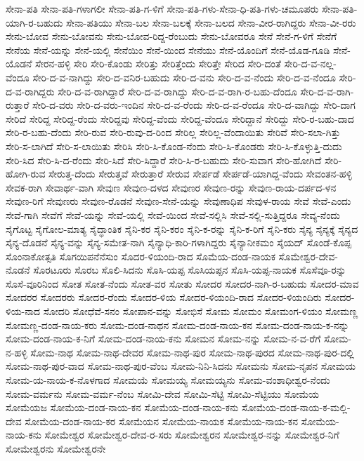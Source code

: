 {ಸೇನಾ-ಪತಿ
ಸೇನಾ-ಪತಿ-ಗಳಾಗಲೀ
ಸೇನಾ-ಪತಿ-ಗ-ಳಿಗೆ
ಸೇನಾ-ಪತಿ-ಗಳು-ಸೇನಾ-ಧಿ-ಪತಿ-ಗಳು-ಚಮೂಪರು
ಸೇನಾ-ಪತಿ-ಯಾಗಿ-ರ-ಬಹುದು
ಸೇನಾ-ಪತಿಯು
ಸೇನಾ-ಬಲ
ಸೇನಾ-ಬಲಕ್ಕೆ
ಸೇನಾ-ಬಲದ
ಸೇನಾ-ವೀರ-ರಾಗಿದ್ದರು
ಸೇನಾ-ವೀ-ರರು
ಸೇನು-ಬೋವ
ಸೇನು-ಬೋವನು
ಸೇನು-ಬೋವ-ರಿದ್ದ-ರೆಂಬುದು
ಸೇನು-ಬೋವರೂ
ಸೇನೆ
ಸೇನೆ-ಗ-ಳಿಗೆ
ಸೇನೆಗೆ
ಸೇನೆಯ
ಸೇನೆ-ಯನ್ನು
ಸೇನೆ-ಯಲ್ಲಿ
ಸೇನೆಯಿಂ
ಸೇನೆ-ಯಿಂದ
ಸೇನೆಯು
ಸೇನೆ-ಯೊಂದಿಗೆ
ಸೇನೆ-ಯೊಡ-ಗೂಡಿ
ಸೇನೆ-ಯೊಡನೆ
ಸೇರನ-ಹಳ್ಳಿ
ಸೇರಿ
ಸೇರಿ-ಕೊಂಡು
ಸೇರಿತ್ತು
ಸೇರಿತ್ತೆಂದು
ಸೇರಿತ್ತೇ
ಸೇರಿದ
ಸೇರಿ-ದಂತೆ
ಸೇರಿ-ದ-ವ-ನಲ್ಲ-ವೆಂದೂ
ಸೇರಿ-ದ-ವ-ನಾಗಿದ್ದು
ಸೇರಿ-ದ-ವನಿರ-ಬಹುದು
ಸೇರಿ-ದ-ವನು
ಸೇರಿ-ದ-ವ-ನೆಂದು
ಸೇರಿ-ದ-ವ-ನೆಂದೂ
ಸೇರಿ-ದ-ವ-ರಾಗಿದ್ದರು
ಸೇರಿ-ದ-ವ-ರಾಗಿದ್ದಾರೆ
ಸೇರಿ-ದ-ವ-ರಾಗಿದ್ದು
ಸೇರಿ-ದ-ವ-ರಾಗಿ-ರ-ಬಹು-ದೆಂದೂ
ಸೇರಿ-ದ-ವ-ರಾಗಿ-ರುತ್ತಾರೆ
ಸೇರಿ-ದ-ವರು
ಸೇರಿ-ದ-ವರು-ಇಂದಿನ
ಸೇರಿ-ದ-ವ-ರೆಂದು
ಸೇರಿ-ದ-ವ-ರೆಂದೂ
ಸೇರಿ-ದ-ವಾಗಿದ್ದು
ಸೇರಿ-ದಾಗ
ಸೇರಿದೆ
ಸೇರಿದ್ದ
ಸೇರಿದ್ದ-ರೆಂದು
ಸೇರಿದ್ದವು
ಸೇರಿದ್ದ-ವೆಂದು
ಸೇರಿದ್ದ-ವೆಂದೂ
ಸೇರಿದ್ದಾನೆ
ಸೇರಿದ್ದು
ಸೇರಿ-ರ-ಬಹು-ದಾದ
ಸೇರಿ-ರ-ಬಹು-ದೆಂದು
ಸೇರಿ-ರುವ
ಸೇರಿ-ರುವು-ದ-ರಿಂದ
ಸೇರಿಲ್ಲ
ಸೇರಿಲ್ಲ-ವೆಂದಾಯಿತು
ಸೇರಿವೆ
ಸೇರಿ-ಸಲಾ-ಗಿತ್ತು
ಸೇರಿ-ಸ-ಲಾಗಿದೆ
ಸೇರಿ-ಸ-ಲಾಯಿತು
ಸೇರಿಸಿ
ಸೇರಿ-ಸಿ-ಕೊಂಡ-ನೆಂದು
ಸೇರಿ-ಸಿ-ಕೊಂಡರು
ಸೇರಿ-ಸಿ-ಕೊಳ್ಳುತ್ತಿ-ದುದು
ಸೇರಿ-ಸಿದ
ಸೇರಿ-ಸಿ-ದ-ರೆಂದು
ಸೇರಿ-ಸಿದೆ
ಸೇರಿ-ಸಿದ್ದಾರೆ
ಸೇರಿ-ಸಿ-ರ-ಬಹುದು
ಸೇರಿ-ಸುವಾಗ
ಸೇರಿ-ಹೋಗಿದೆ
ಸೇರಿ-ಹೋಗಿ-ರುವ
ಸೇರುತ್ತ-ದೆಂದು
ಸೇರುತ್ತವೆ
ಸೇರುತ್ತಾರೆ
ಸೇರುವ
ಸೇರ್ಪಡೆ
ಸೇರ್ಪಡೆ-ಯಾಗಿದ್ದ-ವೆಂದು
ಸೇವಂತನ-ಹಳ್ಳಿ
ಸೇವಕ-ರಾಗಿ
ಸೇವಾರ್ಥ-ವಾಗಿ
ಸೇವುಣ
ಸೇವುಣ-ದಳದ
ಸೇವುಣರ
ಸೇವುಣ-ರನ್ನು
ಸೇವುಣ-ರಾಯ-ದರ್ಪದ-ಳನ
ಸೇವುಣ-ರಿಗೆ
ಸೇವುಣರು
ಸೇವುಣ-ರೊಡನೆ
ಸೇವುಣ-ಸೇನೆ-ಯನ್ನು
ಸೇವುಣಾಧಿಪ
ಸೇವುಳ-ರಾಯ
ಸೇವೆ
ಸೇವೆ-ಎಂದು
ಸೇವೆ-ಗಾಗಿ
ಸೇವೆಗೆ
ಸೇವೆ-ಯನ್ನು
ಸೇವೆ-ಯಲ್ಲಿ
ಸೇವೆ-ಯಿಂದ
ಸೇವೆ-ಸಲ್ಲಿಸಿ
ಸೇವೆ-ಸಲ್ಲಿ-ಸುತ್ತಿದ್ದರೂ
ಸೇವ್ಯ-ನೆಂದು
ಸೈಗೊಟ್ಟ
ಸೈಗೋಲ-ಮಾತ್ಯ
ಸೈದ್ಧಾಂತಿಕ
ಸೈನಿ-ಕರ
ಸೈನಿ-ಕರಂ
ಸೈನಿ-ಕ-ರನ್ನು
ಸೈನಿ-ಕ-ರಿಗೆ
ಸೈನಿ-ಕರು
ಸೈನ್ಯ
ಸೈನ್ಯಕ್ಕೆ
ಸೈನ್ಯದ
ಸೈನ್ಯ-ದೊಡನೆ
ಸೈನ್ಯ-ವನ್ನು
ಸೈನ್ಯ-ಸಮೇತ-ನಾಗಿ
ಸೈನ್ಯಾಧಿ-ಕಾರಿ-ಗಳಾಗಿದ್ದರು
ಸೈನ್ಯಾನೀಕಮಂ
ಸೈಯದ್
ಸೊಂಡೆ-ಕೊಪ್ಪ
ಸೊಂನಾಕೋತ್ಸತಿ
ಸೊಗಯಿಪನೆನೆಸುಂ
ಸೊದರ-ಳಿಯಂದಿ-ರಾದ
ಸೊಮೆಯ-ದಂಡ-ನಾಯಕ
ಸೊಮೇಶ್ವರ-ದೇವ-ನೊಡನೆ
ಸೊರಟೂರು
ಸೊರಬ
ಸೊಲಿ-ಸಿದನು
ಸೊಸಿ-ಯಪ್ಪ
ಸೊಸಿಯಪ್ಪನ
ಸೊಸಿ-ಯಪ್ಪ-ನಾಯಕ
ಸೊಸೆವೂ-ರನ್ನು
ಸೊಸೆ-ವೂರಿನಿಂದ
ಸೋತ
ಸೋತ-ನೆಂದು
ಸೋತ-ವರ
ಸೋತು
ಸೋದರ
ಸೋದರ-ನಾಗಿ-ರ-ಬಹುದು
ಸೋದರ-ಮಾವ
ಸೋದರರ
ಸೋದರರು
ಸೋದರ-ರೆಂದು
ಸೋದರ-ಳಿಯ
ಸೋದರ-ಳಿಯಂದಿ-ರಾದ
ಸೋದರ-ಳಿಯಂದಿರು
ಸೋದರ-ಳಿಯ-ನಾದ
ಸೋದರಿ
ಸೋಧೆವೆ-ಸನಂ
ಸೋಪಾನ-ವನ್ನು
ಸೋಭಿಸೆ
ಸೋಮ
ಸೋಮಂ
ಸೋಮಂಗ-ಳಿಯಂ
ಸೋಮಣ್ಣ
ಸೋಮಣ್ಣ-ದಂಡ-ನಾಯ-ಕರು
ಸೋಮ-ದಂಡ-ನಾಥನ
ಸೋಮ-ದಂಡ-ನಾಯ-ಕನ
ಸೋಮ-ದಂಡ-ನಾಯ-ಕ-ನನ್ನು
ಸೋಮ-ದಂಡ-ನಾಯ-ಕ-ನಿಗೆ
ಸೋಮ-ದಂಡ-ನಾಯ-ಕನು
ಸೋಮನ
ಸೋಮ-ನನ್ನು
ಸೋಮ-ನ-ವ-ರೆಗೆ
ಸೋಮ-ನ-ಹಳ್ಳಿ
ಸೋಮ-ನಾಥ
ಸೋಮ-ನಾಥ-ದೇವರ
ಸೋಮ-ನಾಥ-ಪುರ
ಸೋಮ-ನಾಥ-ಪುರದ
ಸೋಮ-ನಾಥ-ಪುರ-ದಲ್ಲಿ
ಸೋಮ-ನಾಥ-ಪುರ-ವಾದ
ಸೋಮ-ನಾಥ-ಪುರ-ವೆಂಬ
ಸೋಮ-ನಿನಿ-ಸಿದನು
ಸೋಮನು
ಸೋಮ-ನೃಪನ
ಸೋಮಯ
ಸೋಮ-ಯ-ನಾಯ-ಕ-ನೊಳಗಾದ
ಸೋಮಯೆ
ಸೋಮಯ್ಯ
ಸೋಮಯ್ಯನು
ಸೋಮ-ವಂಶಾಧೀಶ್ವರ-ನೆಂದು
ಸೋಮ-ವರ್ಮನು
ಸೋಮ-ವರ್ಮ-ನೆಂಬ
ಸೋಮಿ-ದೇವ
ಸೋಮಿ-ಸೆಟ್ಟಿ
ಸೋಮಿ-ಸೆಟ್ಟಿಯು
ಸೋಮೆಯ
ಸೋಮೆಯಜ
ಸೋಮೆಯ-ದಂಡ-ನಾಯ-ಕನ
ಸೋಮೆಯ-ದಂಡ-ನಾಯ-ಕನು
ಸೋಮೆಯ-ದಂಡ-ನಾಯ-ಕ-ಮಲ್ಲಿ-ದೇವ
ಸೋಮೆಯ-ದಂಡ-ನಾಯ-ಕರ
ಸೋಮೆಯನ
ಸೋಮೆಯ-ನಾಯಕ
ಸೋಮೆಯ-ನಾಯ-ಕನ
ಸೋಮೆಯ-ನಾಯ-ಕನು
ಸೋಮೇಶ್ವರ
ಸೋಮೇಶ್ವರ-ದೇವ-ರ-ಸರು
ಸೋಮೇಶ್ವರನ
ಸೋಮೇಶ್ವರ-ನನ್ನು
ಸೋಮೇಶ್ವರ-ನಿಗೆ
ಸೋಮೇಶ್ವರನು
ಸೋಮೇಶ್ವರನೇ
}
